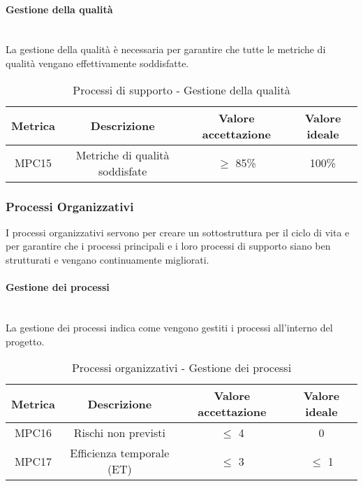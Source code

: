 \documentclass[10pt]{article}
\begin{document}
\begin{justify}

\paragraph{Gestione della qualità}\mbox{}\\
La gestione della qualità è necessaria per garantire che tutte le metriche di qualità vengano effettivamente soddisfatte.\\
\begin{table}[H]
  \centering
\begin{tabular}{|c|c|c|c|}
  \hline
  \textbf{Metrica} & \textbf{Descrizione} & \textbf{Valore accettazione} & \textbf{Valore ideale}\\
  \hline
  MPC15 & Metriche di qualità soddisfate & $\geq$ 85\% & 100\% \\
  \hline
\end{tabular}
\caption{Processi di supporto - Gestione della qualità}
\label{tab:gestione della qualità}
\end{table}

\subsubsection{Processi Organizzativi}
I processi organizzativi servono per creare un sottostruttura per il ciclo di vita e
per garantire che i processi principali e i loro processi di supporto siano ben strutturati e vengano continuamente migliorati.\\
\paragraph{Gestione dei processi}\mbox{}\\
La gestione dei processi indica come vengono gestiti i processi all'interno del progetto.\\
\begin{table}[H]
  \centering
\begin{tabular}{|c|c|c|c|}
  \hline
  \textbf{Metrica} & \textbf{Descrizione} & \textbf{Valore accettazione} & \textbf{Valore ideale}\\
  \hline
  MPC16 & Rischi non previsti & $\leq$ 4 & 0 \\
  \hline
  MPC17 & Efficienza temporale (ET) & $\leq$ 3 & $\leq$ 1 \\
  \hline
\end{tabular}
\caption{Processi organizzativi - Gestione dei processi}
\label{tab:gestione dei processi}
\end{table}


\end{justify}
\end{document}
